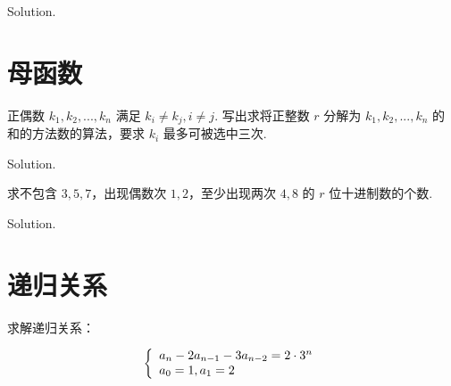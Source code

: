\documentclass[cn, hazy, blue, normal, 12pt]{elegantnote}
\begin{document}
\begin{solution}[print=true]

    Solution.

\end{solution}


\section{母函数}

\begin{exercise}

    正偶数 $k_1, k_2, ..., k_n$ 满足 $k_i \neq k_j, i \neq j$. 写出求将正整数 $r$ 分解为 $k_1, k_2, ..., k_n$ 的和的方法数的算法，要求 $k_i$ 最多可被选中三次.

\end{exercise}

\begin{solution}[print=true]

    Solution.

\end{solution}

\begin{exercise}

    求不包含 $3, 5, 7$，出现偶数次 $1, 2$，至少出现两次 $4, 8$ 的 $r$ 位十进制数的个数.

\end{exercise}

\begin{solution}[print=true]

    Solution.

\end{solution}


\section{递归关系}

\begin{exercise}

    求解递归关系：

    \begin{equation}
        \notag
        \left\{\begin{array}{l}
            a_{n}-2 a_{n-1}-3 a_{n-2}=2 \cdot 3^{n} \\
            a_{0}=1, a_{1}=2
        \end{array}\right.
    \end{equation}

\end{exercise}
\end{document}

